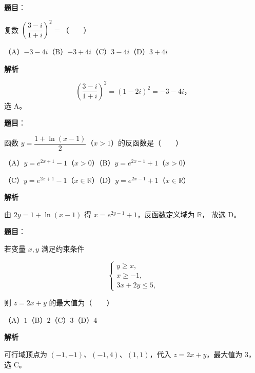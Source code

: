 

\begin{answer}

\textbf{题目}：

复数 $\left(\dfrac{3-i}{1+i}\right)^2=$\mbox{（　　）}

（A）$-3-4i$\quad（B）$-3+4i$\quad（C）$3-4i$\quad（D）$3+4i$

\textbf{解析}

\nopagebreak[4]
\[
\left(\frac{3-i}{1+i}\right)^2=(1-2i)^2=-3-4i\text{，}
\]
选 A。


\end{answer}
\begin{answer}

\textbf{题目}：

函数 $y=\dfrac{1+\ln(x-1)}2$（$x>1$）的反函数是\mbox{（　　）}

（A）$y=e^{2x+1}-1$（$x>0$）\quad（B）$y=e^{2x-1}+1$（$x>0$）

（C）$y=e^{2x+1}-1$（$x\in\mathbb R$）\quad（D）$y=e^{2x-1}+1$（$x\in\mathbb R$）

\textbf{解析}

由 $2y=1+\ln(x-1)$ 得 $x=e^{2y-1}+1$，反函数定义域为 $\mathbb R$，
故选 D。


\end{answer}
\begin{answer}

\textbf{题目}：

若变量 $x,y$ 满足约束条件

\nopagebreak[4]
\[
\begin{cases}
y\geq x,\\
x\geq-1,\\
3x+2y\leq5,
\end{cases}
\]

则 $z=2x+y$ 的最大值为\mbox{（　　）}

（A）$1$\quad（B）$2$\quad（C）$3$\quad（D）$4$

\textbf{解析}

可行域顶点为 $(-1,-1)$、$(-1,4)$、$(1,1)$，代入 $z=2x+y$，最大值为 $3$，选 C。


\end{answer}
